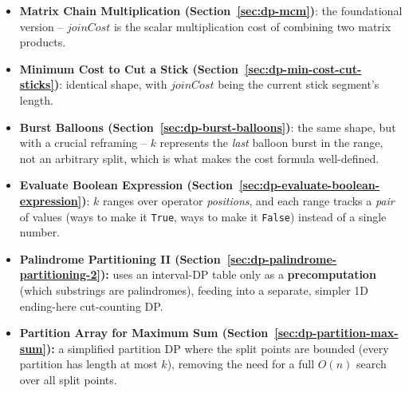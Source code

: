 \begin{patternbox}
\begin{itemize}
  \item \textbf{Matrix Chain Multiplication (Section~\ref{sec:dp-mcm})}:
        the foundational version -- $\textit{joinCost}$ is the scalar
        multiplication cost of combining two matrix products.
  \item \textbf{Minimum Cost to Cut a Stick (Section~\ref{sec:dp-min-cost-cut-sticks})}:
        identical shape, with $\textit{joinCost}$ being the current
        stick segment's length.
  \item \textbf{Burst Balloons (Section~\ref{sec:dp-burst-balloons})}:
        the same shape, but with a crucial reframing -- $k$ represents
        the \emph{last} balloon burst in the range, not an arbitrary
        split, which is what makes the cost formula well-defined.
  \item \textbf{Evaluate Boolean Expression (Section~\ref{sec:dp-evaluate-boolean-expression})}:
        $k$ ranges over operator \emph{positions}, and each range
        tracks a \emph{pair} of values (ways to make it \texttt{True},
        ways to make it \texttt{False}) instead of a single number.
  \item \textbf{Palindrome Partitioning II (Section~\ref{sec:dp-palindrome-partitioning-2}):}
        uses an interval-DP table only as a \textbf{precomputation}
        (which substrings are palindromes), feeding into a separate,
        simpler 1D ending-here cut-counting DP.
  \item \textbf{Partition Array for Maximum Sum (Section~\ref{sec:dp-partition-max-sum}):}
        a simplified partition DP where the split points are bounded
        (every partition has length at most $k$), removing the need
        for a full $O(n)$ search over all split points.
\end{itemize}
\end{patternbox}

\newpage







